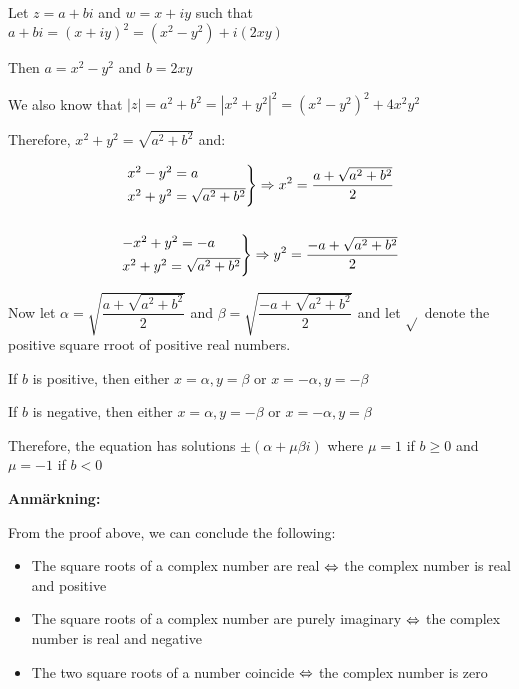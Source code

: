 \begin{prf}[]{}
  Let $z = a+bi$ and $w = x+iy$ such that $a+bi = (x+iy)^2 = (x^2-y^2)+i(2xy)$
  \par\bigskip
  \noindent Then $a = x^2-y^2$ and $b = 2xy$\par
  \noindent We also know that $\left|z\right| = a^2+b^2 = \left|x^2+y^2\right|^2 = (x^2-y^2)^2+4x^2y^2$
  \par\bigskip
  \noindent Therefore, $x^2+y^2 = \sqrt{a^2+b^2}$ and:
  \par\bigskip
  \begin{equation*}
    \begin{gathered}
      \begin{rcases*}
        x^2-y^2 = a\\
        x^2+y^2 = \sqrt{a^2+b^2}
      \end{rcases*}\Rightarrow x^2 = \dfrac{a+\sqrt{a^2+b^2}}{2}\\\\
      \begin{rcases*}
        -x^2+y^2 = -a\\
        x^2+y^2 = \sqrt{a^2+b^2}
      \end{rcases*}\Rightarrow y^2 = \dfrac{-a+\sqrt{a^2+b^2}}{2}
    \end{gathered}
  \end{equation*}
  \par\bigskip
  \noindent Now let $\alpha = \sqrt{\dfrac{a+\sqrt{a^2+b^2}}{2}}$ and $\beta = \sqrt{\dfrac{-a+\sqrt{a^2+b^2}}{2}}$ and let $\sqrt{}$ denote the positive square rroot of positive real numbers.
  \par\bigskip
  \noindent If $b$ is positive, then either $x = \alpha, y=\beta$ or $x=-\alpha, y=-\beta$\par
  \noindent If $b$ is negative, then either $x = \alpha, y=-\beta$ or $x=-\alpha, y=\beta$
  \par\bigskip
  \noindent Therefore, the equation has solutions $\pm(\alpha+\mu\beta i)$ where $\mu=1$ if $b\geq0$ and $\mu = -1$ if $b<0$ 
  \par\bigskip
\end{prf}
\par\bigskip
\noindent\textbf{Anmärkning:}\par
\noindent From the proof above, we can conclude the following:\par
\begin{itemize}
  \item The square roots of a complex number are real $\Leftrightarrow$ the complex number is real and positive
  \item The square roots of a complex number are purely imaginary $\Leftrightarrow$ the complex number is real and negative
  \item The two square roots of a number coincide $\Leftrightarrow$ the complex number is zero 
\end{itemize}
\par\bigskip
